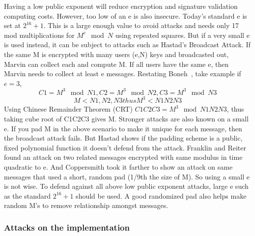 \documentclass[12pt,journal,compsoc]{IEEEtran}
\begin{document}
Having a low public exponent will reduce encryption and signature
validation computing costs.  However, too low of an e is also
insecure.  Today’s standard e is set at $2^{16} + 1$.   This is a large
enough value to avoid attacks and needs only 17 mod multiplications
for $M^{e} \mod N$ using repeated squares. But if a very small e is used
instead, it can be subject to attacks such as Hastad’s Broadcast
Attack.  If the same M is encrypted with many users (e,N) keys and
broadcasted out, Marvin can collect each and compute M.  If all users
have the same e, then Marvin needs to collect at least e messages.
Restating Boneh~\cite{boneh1999twenty}, take example if $e=3$,
\begin{equation}
  \label{eq:low-public-expo-1}
  C1 = M^{3} \mod N1, C2 = M^{3} \mod N2, C3 = M^{3} \mod N3
\end{equation}
\begin{equation}
  \label{eq:low-public-expo-2}
  M < {N1, N2, N3} thus M^{3} < N1N2N3
\end{equation}
Using Chinese Remainder Theorem (CRT) $C1C2C3 = M^{3} \mod N1N2N3$, thus
taking cube root of C1C2C3 gives M. Stronger attacks are also known on
a small e.  If you pad M in the above scenario to make it unique for
each message, then the broadcast attack fails.  But Hastad shows if
the padding scheme is a public, fixed polynomial function it doesn’t
defend from the attack.  Franklin and Reiter found an attack on two
related messages encrypted with same modulus in time quadratic to
e. And Coppersmith took it farther to show an attack on same messages
that used a short, random pad (1/9th the size of M).  So using a small
e is not wise. To defend against all above low public exponent
attacks, large e such as the standard $2^{16} + 1$ should be used.  A
good randomized pad also helps make random M’s to remove relationship
amongst messages. 

\subsubsection{\qquad Attacks on the implementation}
\label{sec:qquad-attacks-impl}
\end{document}
